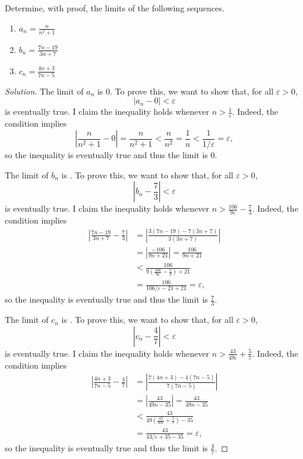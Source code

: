\documentclass[11pt]{scrartcl}
\providecommand{\eps}{\varepsilon}
\providecommand{\ii}{\item}
\theoremstyle{remark}
\newenvironment{problem}[1]
{\renewcommand\theinnercustomthm{\textit{#1}}\innercustomthm}
{\endinnercustomthm}
\newenvironment{soln}{\begin{proof}[Solution]}{\end{proof}}
\providecommand{\abs}[1]{\left|#1\right|}
\begin{document}
	\begin{problem}{8.2}
		Determine, with proof, the limits of the following sequences.
		\begin{enumerate}[\textbf{(\alph*)}]
			\ii $a_n = \frac{n}{n^2 + 1}$
			\ii $b_n = \frac{7n - 19}{3n + 7}$
			\ii $c_n = \frac{4n + 3}{7n - 5}$
		\end{enumerate}
	\end{problem}
	\begin{soln}
		The limit of $a_n$ is $\boxed 0$.
		To prove this, we want to show that, for all $\eps > 0$,
		\[|a_n - 0| < \eps\]
		is eventually true. I claim the inequality holds whenever $n > \frac1\eps$.
		Indeed, the condition implies
		\[\abs{\frac{n}{n^2 + 1} - 0} = \frac{n}{n^2 + 1} < \frac{n}{n^2}
		= \frac{1}{n} < \frac{1}{1/\eps} = \eps,\]
		so the inequality is eventually true and thus the limit is $0$.
		
		The limit of $b_n$ is .
		To prove this, we want to show that, for all $\eps > 0$,
		\[\abs{b_n - \frac73} < \eps\]
		is eventually true. I claim the inequality holds whenever
		$n > \frac{106}{9\eps} - \frac{7}{3}$.
		Indeed, the condition implies
		\begin{align*}
			\abs{\frac{7n - 19}{3n + 7} - \frac73} &=
			\abs{\frac{3(7n - 19) - 7(3n + 7)}{3(3n + 7)}}\\
			&= \abs{\frac{-106}{9n + 21}} = \frac{106}{9n + 21}\\
			&< \frac{106}{9\left(\frac{106}{9\eps} - \frac{7}{3}\right) + 21}\\
			&= \frac{106}{106/\eps - 21 + 21} = \eps,
		\end{align*}
		so the inequality is eventually true and thus the limit is $\frac73$.
		
		The limit of $c_n$ is .
		To prove this, we want to show that, for all $\eps > 0$,
		\[\abs{c_n - \frac47} < \eps\]
		is eventually true. I claim the inequality holds whenever
		$n > \frac{43}{49\eps} + \frac{5}{7}$.
		Indeed, the condition implies
		\begin{align*}
			\abs{\frac{4n + 3}{7n - 5} - \frac47} &=
			\abs{\frac{7(4n + 3) - 4(7n - 5)}{7(7n-5)}}\\
			&= \abs{\frac{43}{49n - 35}} = \frac{43}{49n - 35}\\
			&< \frac{43}{49\left(\frac{43}{49\eps} + \frac{5}{7}\right) - 35}\\
			&= \frac{43}{43/\eps + 35 - 35} = \eps,
		\end{align*}
		so the inequality is eventually true and thus the limit is $\frac47$.
	\end{soln}
	
\end{document}
